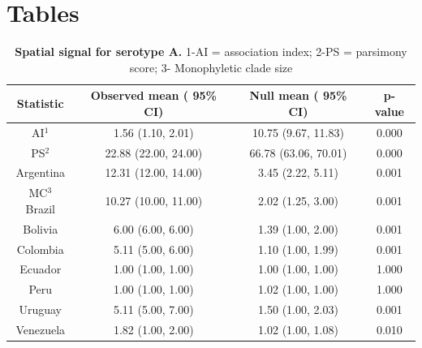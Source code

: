 \documentclass[10pt]{article}
\begin{document}
\newpage
\section*{Tables}
\begin{table}[!ht]
\caption{
\textbf{Spatial signal for serotype A.} 1-AI = association index; 2-PS = parsimony score; 3- Monophyletic clade size}
\begin{tabular}{cccc}
\toprule
Statistic &	Observed mean ( 95\% CI)&	Null mean ( 95\% CI)&	p-value\\
\midrule
AI$^1$	&1.56 (1.10, 2.01)& 10.75 (9.67, 11.83) &0.000\\
PS$^2$	&22.88 (22.00, 24.00)	&66.78	(63.06, 70.01)	&0.000\\
Argentina &12.31 (12.00, 14.00)	&3.45	(2.22, 5.11)	&0.001\\
MC$^3$ Brazil &10.27	(10.00, 11.00)	&2.02 (1.25, 3.00) &0.001\\
Bolivia &6.00 (6.00, 6.00)	&1.39 (1.00, 2.00)	&0.001\\
Colombia &5.11 (5.00, 6.00)	&1.10  (1.00, 1.99)	&0.001\\
Ecuador &1.00 (1.00, 1.00)	&1.00 (1.00, 1.00)	&1.000\\
Peru&1.00 (1.00, 1.00)	&1.02 (1.00, 1.00)	&1.000\\
Uruguay &5.11 (5.00, 7.00)	&1.50	(1.00, 2.03)	&0.001\\
Venezuela&1.82 (1.00, 2.00)	&1.02 (1.00, 1.08)	&0.010\\
\bottomrule
\end{tabular}
\begin{flushleft}
\end{flushleft}
\label{tab:BaTSA}
 \end{table}
\end{document}

